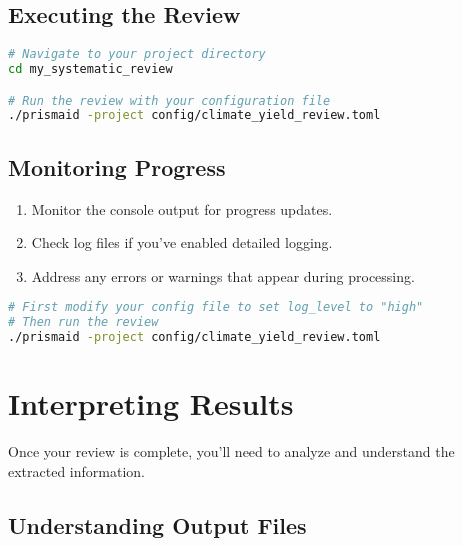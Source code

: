 \subsection{Executing the Review}
\begin{commandbox}
\begin{lstlisting}[language=Bash]
# Navigate to your project directory
cd my_systematic_review

# Run the review with your configuration file
./prismaid -project config/climate_yield_review.toml
\end{lstlisting}
\end{commandbox}

\subsection{Monitoring Progress}

\begin{enumerate}
    \item Monitor the console output for progress updates.
    \item Check log files if you've enabled detailed logging.
    \item Address any errors or warnings that appear during processing.
\end{enumerate}

\begin{commandbox}
\begin{lstlisting}[language=Bash]
# First modify your config file to set log_level to "high"
# Then run the review
./prismaid -project config/climate_yield_review.toml
\end{lstlisting}
\end{commandbox}

\section{Interpreting Results}

Once your review is complete, you'll need to analyze and understand the extracted information.

\subsection{Understanding Output Files}

